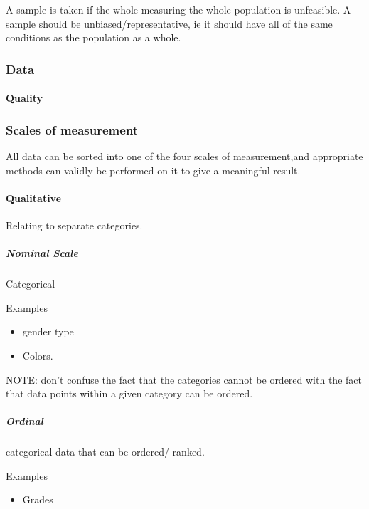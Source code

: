 \documentclass[]{article}
\providecommand{\tightlist}{%
  \setlength{\itemsep}{0pt}\setlength{\parskip}{0pt}}
\let\oldparagraph\paragraph
\renewcommand{\paragraph}[1]{\oldparagraph{#1}\mbox{}}
\let\oldsubparagraph\subparagraph
\renewcommand{\subparagraph}[1]{\oldsubparagraph{#1}\mbox{}}
\begin{document}
A sample is taken if the whole measuring the whole population is
unfeasible. A sample should be unbiased/representative, ie it should
have all of the same conditions as the population as a whole.

\hypertarget{data}{%
\subsubsection{Data}\label{data}}

\hypertarget{quality}{%
\paragraph{Quality}\label{quality}}

\hypertarget{scales-of-measurement}{%
\subsubsection{Scales of measurement}\label{scales-of-measurement}}

All data can be sorted into one of the four scales of measurement,and
appropriate methods can validly be performed on it to give a meaningful
result.

\hypertarget{qualitative}{%
\paragraph{Qualitative}\label{qualitative}}

Relating to separate categories.

\hypertarget{nominal-scale}{%
\subparagraph{Nominal Scale}\label{nominal-scale}}

Categorical

Examples

\begin{itemize}
\tightlist
\item
  gender type
\item
  Colors.
\end{itemize}

NOTE: don't confuse the fact that the categories cannot be ordered with
the fact that data points within a given category can be ordered.

\hypertarget{ordinal}{%
\subparagraph{Ordinal}\label{ordinal}}

categorical data that can be ordered/ ranked.

Examples

\begin{itemize}
\tightlist
\item
  Grades
\end{itemize}
\end{document}
